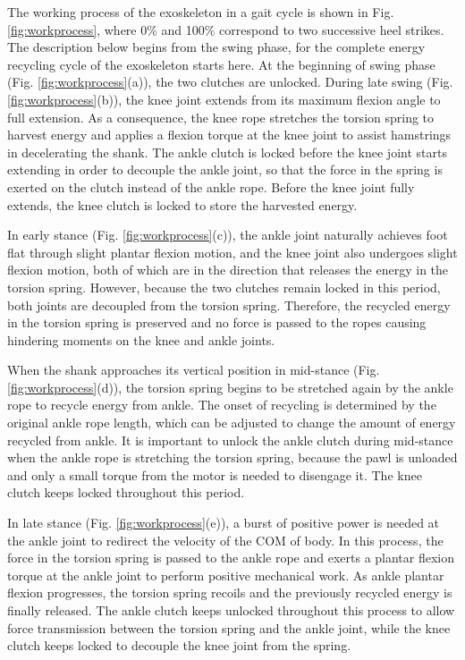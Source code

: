 \documentclass[twocolumn,cleanfoot,10pt]{asme2ej}
\begin{document}
The working process of the exoskeleton in a gait cycle is shown in Fig. \ref{fig:workprocess}, where 0\% and 100\% correspond to two successive heel strikes.
The description below begins from the swing phase, for the complete energy recycling cycle of the exoskeleton starts here.
At the beginning of swing phase (Fig. \ref{fig:workprocess}(a)), the two clutches are unlocked.
During late swing (Fig. \ref{fig:workprocess}(b)), the knee joint extends from its maximum flexion angle to full extension.
As a consequence, the knee rope stretches the torsion spring to harvest energy and applies a flexion torque at the knee joint to assist hamstrings in decelerating the shank.
The ankle clutch is locked before the knee joint starts extending in order to decouple the ankle joint, so that the force in the spring is exerted on the clutch instead of the ankle rope.
Before the knee joint fully extends, the knee clutch is locked to store the harvested energy.

In early stance (Fig. \ref{fig:workprocess}(c)), the ankle joint naturally achieves foot flat through slight plantar flexion motion, and the knee joint also undergoes slight flexion motion, both of which are in the direction that releases the energy in the torsion spring.
However, because the two clutches remain locked in this period, both joints are decoupled from the torsion spring.
Therefore, the recycled energy in the torsion spring is preserved and no force is passed to the ropes causing hindering moments on the knee and ankle joints.

When the shank approaches its vertical position in mid-stance (Fig. \ref{fig:workprocess}(d)), the torsion spring begins to be stretched again by the ankle rope to recycle energy from ankle.
The onset of recycling is determined by the original ankle rope length, which can be adjusted to change the amount of energy recycled from ankle.
It is important to unlock the ankle clutch during mid-stance when the ankle rope is stretching the torsion spring, because the pawl is unloaded and only a small torque from the motor is needed to disengage it.
The knee clutch keeps locked throughout this period.

In late stance (Fig. \ref{fig:workprocess}(e)), a burst of positive power is needed at the ankle joint to redirect the velocity of the COM of body.
In this process, the force in the torsion spring is passed to the ankle rope and exerts a plantar flexion torque at the ankle joint to perform positive mechanical work.
As ankle plantar flexion progresses, the torsion spring recoils and the previously recycled energy is finally released.
The ankle clutch keeps unlocked throughout this process to allow force transmission between the torsion spring and the ankle joint, while the knee clutch keeps locked to decouple the knee joint from the spring.
\end{document}
